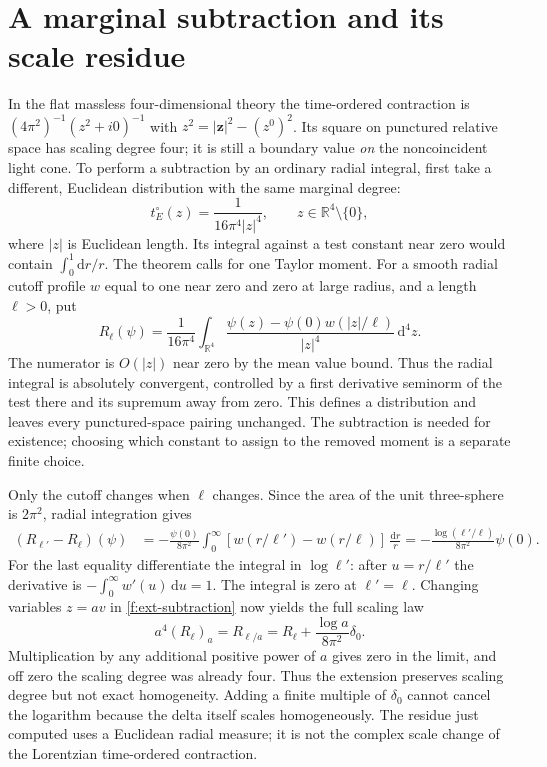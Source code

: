 \section{A marginal subtraction and its scale residue}
In the flat massless four-dimensional theory the time-ordered contraction
is $(4\pi^2)^{-1}(z^2+i0)^{-1}$ with $z^2=|\mathbf z|^2-(z^0)^2$.
Its square on punctured relative space has scaling degree four; it is
still a boundary value \emph{on} the noncoincident light cone. To perform
a subtraction by an ordinary radial integral, first take a different,
Euclidean distribution with the same marginal degree:
\[
 t_E^\circ(z)=\frac{1}{16\pi^4|z|^4},\qquad z\in\mathbb R^4\setminus\{0\},
\]
where $|z|$ is Euclidean length. Its integral against a test constant near
zero would contain $\int_0^1\mathrm{d}r/r$. The theorem calls for one
Taylor moment. For a smooth radial cutoff profile $w$ equal to one near
zero and zero at large radius, and a length $\ell>0$, put
\begin{equation}
 R_\ell(\psi)=\frac1{16\pi^4}\int_{\mathbb R^4}
  \frac{\psi(z)-\psi(0)w(|z|/\ell)}{|z|^4}\,\mathrm{d}^4z .
 \label{f:ext-subtraction}
\end{equation}
The numerator is $O(|z|)$ near zero by the mean value bound. Thus the
radial integral is absolutely convergent, controlled by a first derivative
seminorm of the test there and its supremum away from zero. This defines
a distribution and leaves every punctured-space pairing unchanged. The
subtraction is needed for existence; choosing which constant to assign
to the removed moment is a separate finite choice.

Only the cutoff changes when $\ell$ changes. Since the area of the unit
three-sphere is $2\pi^2$, radial integration gives
\begin{align}
 (R_{\ell'}-R_\ell)(\psi)
 &=-\frac{\psi(0)}{8\pi^2}\int_0^\infty
       [w(r/\ell')-w(r/\ell)]\,\frac{\mathrm{d}r}{r}
   =-\frac{\log(\ell'/\ell)}{8\pi^2}\psi(0) .
 \label{f:ext-residue}
\end{align}
For the last equality differentiate the integral in $\log\ell'$: after
$u=r/\ell'$ the derivative is $-\int_0^\infty w'(u)\,\mathrm{d}u=1$.
The integral is zero at $\ell'=\ell$. Changing variables $z=a v$ in
\eqref{f:ext-subtraction} now yields the full scaling law
\[
 a^4(R_\ell)_a=R_{\ell/a}=R_\ell+\frac{\log a}{8\pi^2}\delta_0 .
\]
Multiplication by any additional positive power of $a$ gives zero in the
limit, and off zero the scaling degree was already four. Thus the
extension preserves scaling degree but not exact homogeneity. Adding a
finite multiple of $\delta_0$ cannot cancel the logarithm because the
delta itself scales homogeneously. The residue just computed uses a
Euclidean radial measure; it is not the complex scale change of the
Lorentzian time-ordered contraction.

